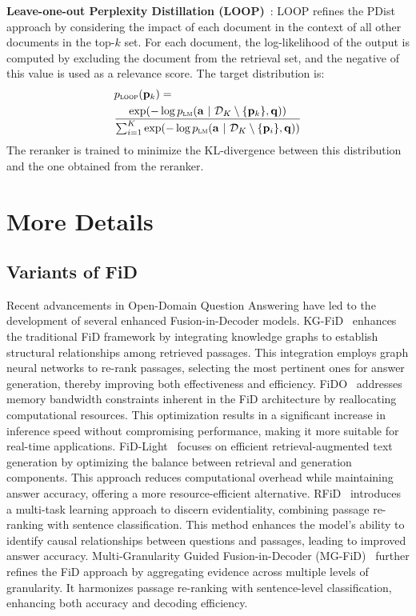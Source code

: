 \textbf{Leave-one-out Perplexity Distillation (LOOP)}~\cite{DBLP:journals/jmlr/IzacardLLHPSDJRG23}: LOOP refines the PDist approach by considering the impact of each document in the context of all other documents in the top-$k$ set. For each document, the log-likelihood of the output is computed by excluding the document from the retrieval set, and the negative of this value is used as a relevance score. The target distribution is:
\begin{equation*}
    \begin{aligned}
        &p_{\textsc{loop}}(\mathbf{p}_k) = \\
        &\frac{\exp(- \log p_{\textsc{lm}} (\mathbf{a} \ | \ \mathcal{D}_K \setminus \{ \mathbf{p}_k \}, \mathbf{q}))}
        {\sum_{i=1}^K \exp (- \log p_{\textsc{lm}} (\mathbf{a} \ | \ \mathcal{D}_K \setminus \{ \mathbf{p}_i \}, \mathbf{q}))}
    \end{aligned}
\end{equation*}
The reranker is trained to minimize the KL-divergence between this distribution and the one obtained from the reranker.


\section{More Details}
\subsection{Variants of FiD}\label{sec: appendix_fid}
Recent advancements in Open-Domain Question Answering have led to the development of several enhanced Fusion-in-Decoder models. KG-FiD~\cite{DBLP:conf/acl/Yu0F0WXRY022} enhances the traditional FiD framework by integrating knowledge graphs to establish structural relationships among retrieved passages. This integration employs graph neural networks to re-rank passages, selecting the most pertinent ones for answer generation, thereby improving both effectiveness and efficiency. FiDO~\cite{DBLP:conf/acl/JongZAFSSC23} addresses memory bandwidth constraints inherent in the FiD architecture by reallocating computational resources. This optimization results in a significant increase in inference speed without compromising performance, making it more suitable for real-time applications. FiD-Light~\cite{DBLP:conf/sigir/HofstatterC0Z23} focuses on efficient retrieval-augmented text generation by optimizing the balance between retrieval and generation components. This approach reduces computational overhead while maintaining answer accuracy, offering a more resource-efficient alternative. RFiD~\cite{DBLP:conf/acl/WangY023} introduces a multi-task learning approach to discern evidentiality, combining passage re-ranking with sentence classification. This method enhances the model's ability to identify causal relationships between questions and passages, leading to improved answer accuracy. Multi-Granularity Guided Fusion-in-Decoder (MG-FiD)~\cite{DBLP:conf/naacl/ChoiLL24} further refines the FiD approach by aggregating evidence across multiple levels of granularity. It harmonizes passage re-ranking with sentence-level classification, enhancing both accuracy and decoding efficiency.


